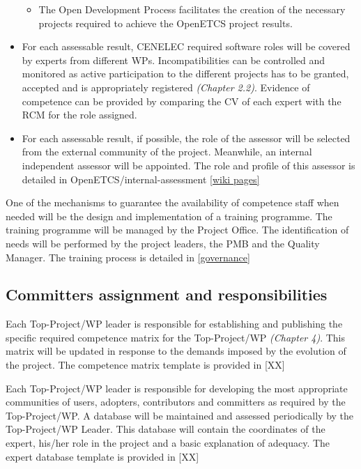 \documentclass{template/openetcs_article}
\begin{document}
\begin{itemize}
\begin{itemize}
\item The Open Development Process facilitates the creation of the necessary projects required to achieve the OpenETCS project results.
\end{itemize}
\item For each assessable result, CENELEC required software roles will be covered by experts from different WPs. Incompatibilities can be controlled and monitored as active participation to the different projects has to be granted, accepted and is appropriately registered  \textit{(Chapter 2.2)}. Evidence of competence can be provided by comparing the CV of each expert with the RCM for the role assigned.
\item For each assessable result, if possible, the role of the assessor will be selected from the external community of the project. Meanwhile, an internal independent assessor will be appointed. The role and profile of this assessor is detailed in OpenETCS/internal-assessment \citep{IA} \href{https://github.com/openETCS/ecosystem/wiki/WP4:-internal-assessment}{[wiki pages]}
\end{itemize}

One of the mechanisms to guarantee the availability of competence staff when needed will be the design and implementation of a training programme. The training programme will be managed by the Project Office. The identification of needs will be performed by the project leaders, the PMB and the Quality Manager. 
The training process is detailed in \href{https://github.com/openETCS/governance/tree/master/Training%20Process}{[governance]}


\subsection{Committers assignment and responsibilities}

Each Top-Project/WP leader is responsible for establishing and publishing the specific required competence matrix for the Top-Project/WP \textit{(Chapter 4)}. This matrix will be updated in response to the demands imposed by the evolution of the project. The competence matrix template \citep{Competence}is provided in [XX]

Each Top-Project/WP leader is responsible for developing the most appropriate communities of users, adopters, contributors and committers as required by the Top-Project/WP. A database will be maintained and assessed periodically by the Top-Project/WP Leader. This database will contain the coordinates of the expert, his/her role in the project and a basic explanation of adequacy. The expert database template is provided in [XX]
\end{document}
